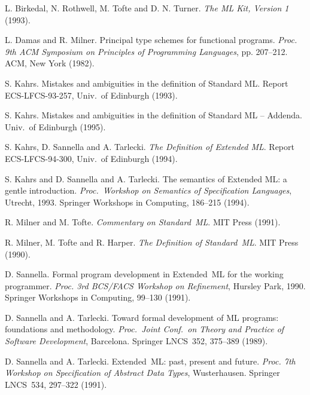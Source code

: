 
\begin{thebibliography}{10}

 L. Birkedal, N. Rothwell, M. Tofte and D. N. Turner. 
{\it The ML Kit, Version 1} (1993).

 L. Damas and R. Milner.
Principal type schemes for functional programs.
{\it Proc. 9th ACM Symposium on Principles of 
Programming Languages}, pp. 207--212. ACM, New York (1982).
 
 S. Kahrs.
Mistakes and ambiguities in the definition of Standard ML.
Report ECS-LFCS-93-257, Univ.~of Edinburgh (1993).

 S. Kahrs.
Mistakes and ambiguities in the definition of Standard ML -- Addenda.
Univ.~of Edinburgh (1995).

 S. Kahrs, D. Sannella and A. Tarlecki.
{\it The Definition of Extended ML}.
Report ECS-LFCS-94-300, Univ.~of Edinburgh (1994).

 S. Kahrs and D. Sannella and A. Tarlecki.
The semantics of Extended ML: a gentle introduction.
{\it Proc.\ Workshop on Semantics of Specification Languages},
Utrecht, 1993. Springer Workshops in Computing, 186--215 (1994).

 R. Milner and M. Tofte.
{\it Commentary on Standard~ML}.
MIT Press (1991).

 R. Milner, M. Tofte and R. Harper.
{\it The Definition of Standard~ML}.
MIT Press (1990).

 D. Sannella.
Formal program development in Extended~ML for the working programmer.
{\it Proc. 3rd BCS/FACS Workshop on Refinement}, Hursley Park, 1990.
Springer Workshops in Computing, 99--130 (1991).

 D. Sannella and A. Tarlecki.
Toward formal development of ML programs: foundations and methodology.
{\it Proc.\ Joint Conf.\ on Theory and Practice of Software Development},
Barcelona.
Springer LNCS~352, 375--389 (1989). 

 D. Sannella and A. Tarlecki.
Extended~ML: past, present and future.
{\it Proc. 7th Workshop on Specification of Abstract Data Types}, Wusterhausen.
Springer LNCS~534, 297--322 (1991).
                                           
\end{thebibliography}